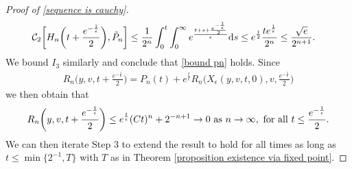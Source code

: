 \documentclass[11pt]{article}
\numberwithin{equation}{section}
\newcommand{\der}{\textup{d}}
\begin{document}
\begin{proof}[Proof of \eqref{sequence is cauchy}]
\begin{align*}
    \mathcal{C}_{2}& \bigg[H_{n}\bigg(t+\frac{e^{-\frac{1}{\epsilon}}}{2}\bigg),\tilde{P}_{n}\bigg]\leq\frac{1}{2^{n}}\int_{0}^{t}\int_{0}^{\infty}e^{\frac{t+s+\frac{e^{-\frac{1}{\epsilon}}}{2}}{\epsilon}}\der s\leq e^{\frac{1}{2}}\frac{te^{\frac{1}{\epsilon}}}{2^{n}}\leq \frac{\sqrt{e}}{2^{n+1}}.
\end{align*}
We bound $I_{3}$ similarly and conclude that \eqref{bound pn} holds. Since
\begin{align*}
    R_{n}\bigg(y,v,t+\frac{e^{-\frac{1}{\epsilon}}}{2}\bigg)=P_{n}(t)+e^{\frac{t}{\epsilon}}R_{n}\bigg(X_{\epsilon}(y,v,t,0),v,\frac{e^{-\frac{1}{\epsilon}}}{2}\bigg)
\end{align*}
we then obtain that
\begin{align*}
     R_{n}\bigg(y,v,t+\frac{e^{-\frac{1}{\epsilon}}}{2}\bigg)\leq   e^{\frac{t}{\epsilon}}(Ct)^{n}+2^{-n+1}\rightarrow 0 \textup{ as } n\rightarrow \infty, \textup{ for all } t\leq \frac{e^{-\frac{1}{\epsilon}}}{2}.
\end{align*}
We can then iterate Step $3$ to extend the result to hold for all times as long as $t\leq\min\{2^{-1},T\}$ with $T$ as in Theorem \ref{proposition existence via fixed point}.

\vspace{0.2cm}




\end{proof}
\end{document}
